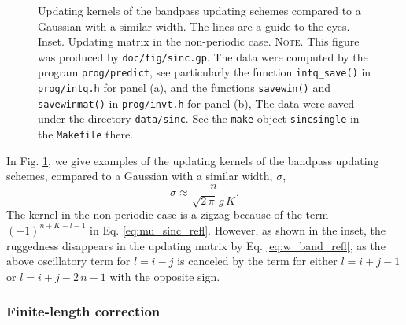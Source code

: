 \documentclass[reprint, floatfix]{revtex4-1}
\newcommand{\note}[1]{{\color{DarkGreen}\footnotesize \textsc{Note.} #1}}
\begin{document}
\begin{figure}[h]
\begin{center}
  \caption{
    \label{fig:sinc}
    Updating kernels of the bandpass updating schemes
    compared to a Gaussian with a similar width.
    The lines are a guide to the eyes.
    Inset. Updating matrix in the non-periodic case.
    \note{This figure was produced by \texttt{doc/fig/sinc.gp}.
      The data were computed by the program \texttt{prog/predict},
      see particularly the function \texttt{intq\_save()}
      in \texttt{prog/intq.h} for panel (a),
      and the functions \texttt{savewin()}
      and \texttt{savewinmat()}
      in \texttt{prog/invt.h} for panel (b),
      The data were saved under the directory \texttt{data/sinc}.
      See the \texttt{make} object \texttt{sincsingle}
      in the \texttt{Makefile} there.
    }%
  }
\end{center}
\end{figure}


In Fig. \ref{fig:sinc},
we give examples of the updating kernels
of the bandpass updating schemes,
compared to a Gaussian
with a similar width, $\sigma$,
%
\begin{equation}
  \sigma
  \approx
  \frac
  {
    n
  }
  {
    \sqrt{ 2 \, \pi } \, g \, K
  }
  .
\label{eq:sigma_equiv}
\end{equation}
%
%
The kernel in the non-periodic case is a zigzag
because of the term $(-1)^{n+K+l-1}$
in Eq. \eqref{eq:mu_sinc_refl}.
%
However, as shown in the inset, %
the ruggedness disappears
in the updating matrix by Eq. \eqref{eq:w_band_refl},
as the above oscillatory term for $l = i - j$
is canceled by the term for either $l = i + j - 1$
or $l = i + j - 2 \, n - 1$
with the opposite sign.



\subsubsection{\label{sec:finlencorr}
Finite-length correction}
\end{document}
